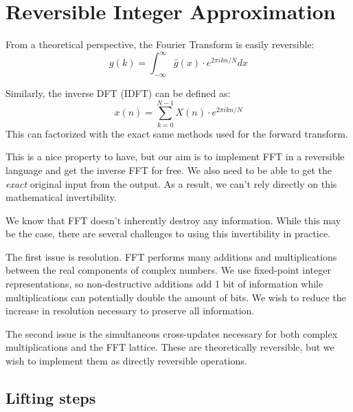 \section{Reversible Integer Approximation}

From a theoretical perspective, the Fourier Transform is easily reversible:
\begin{equation}
    g(k) = \int_{-\infty}^{\infty} \hat g(x) \cdot e^{2 \pi i k n / N} dx
\end{equation}


Similarly, the inverse DFT (IDFT) can be defined as:
\begin{equation}
    x(n) = \sum_{k = 0}^{N - 1} X(n) \cdot e^{2 \pi i kn / N}
\end{equation}
This can factorized with the exact same methods used for the forward transform.

This is a nice property to have,
but our aim is to implement FFT in a reversible language and get the inverse FFT for free.
We also need to be able to get the \textit{exact} original input from the output.
As a result, we can't rely directly on this mathematical invertibility.

We know that FFT doesn't inherently destroy any information.
While this may be the case,
there are several challenges to using this invertibility in practice.

The first issue is resolution.
FFT performs many additions and multiplications between the real components of complex numbers.
We use fixed-point integer representations,
so non-destructive additions add 1 bit of information
while multiplications can potentially double the amount of bits.
We wish to reduce the increase in resolution necessary to preserve all information.

The second issue is the simultaneous cross-updates
necessary for both complex multiplications and the FFT lattice.
These are theoretically reversible,
but we wish to implement them as directly reversible operations.

\subsection{Lifting steps}

